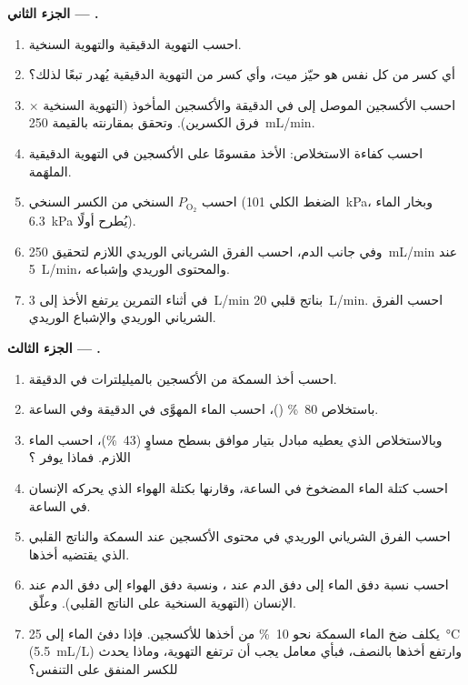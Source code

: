 \begin{problem}
\medskip
\noindent\textbf{الجزء الثاني --- .}
\begin{enumerate}[resume]
  \item احسب التهوية الدقيقية والتهوية السنخية.
  \item أي كسر من كل نفس هو حيّز ميت، وأي كسر من التهوية الدقيقية
        يُهدر تبعًا لذلك؟
  \item احسب الأكسجين الموصل إلى  في الدقيقة والأكسجين
        المأخوذ (التهوية السنخية $\times$ فرق الكسرين). وتحقق
        بمقارنته بالقيمة \qty{250}{mL/min}.
  \item احسب كفاءة الاستخلاص: الأخذ مقسومًا على الأكسجين في
        التهوية الدقيقية الملهَمة.
  \item احسب $P_{\mathrm{O_2}}$ السنخي من الكسر السنخي (الضغط
        الكلي \qty{101}{kPa}، وبخار الماء \qty{6.3}{kPa} يُطرح
        أولًا).
  \item وفي جانب الدم، احسب الفرق الشرياني الوريدي اللازم
        لتحقيق \qty{250}{mL/min} عند \qty{5}{L/min}، والمحتوى الوريدي
        وإشباعه.
  \item في أثناء التمرين يرتفع الأخذ إلى \qty{3}{L/min} بناتج
        قلبي \qty{20}{L/min}. احسب الفرق الشرياني الوريدي والإشباع
        الوريدي.
\end{enumerate}

\medskip
\noindent\textbf{الجزء الثالث --- .}
\begin{enumerate}[resume]
  \item احسب أخذ السمكة من الأكسجين بالميليلترات في الدقيقة.
  \item باستخلاص \qty{80}{\%} ()، احسب الماء المهوَّى في
        الدقيقة وفي الساعة.
  \item وبالاستخلاص الذي يعطيه مبادل بتيار موافق بسطح مساوٍ
        (\qty{43}{\%})، احسب الماء اللازم. فماذا يوفر ؟
  \item احسب كتلة الماء المضخوخ في الساعة، وقارنها بكتلة الهواء
        الذي يحركه الإنسان في الساعة.
  \item احسب الفرق الشرياني الوريدي في محتوى الأكسجين عند السمكة
        والناتج القلبي الذي يقتضيه أخذها.
  \item احسب نسبة دفق الماء إلى دفق الدم عند ، ونسبة دفق
        الهواء إلى دفق الدم عند  الإنسان (التهوية السنخية على
        الناتج القلبي). وعلّق.
  \item يكلف ضخ الماء السمكة نحو \qty{10}{\%} من أخذها للأكسجين.
        فإذا دفئ الماء إلى \qty{25}{\celsius}
        (\qty{5.5}{mL/L}) وارتفع أخذها بالنصف، فبأي معامل يجب أن
        ترتفع التهوية، وماذا يحدث للكسر المنفق على التنفس؟
\end{enumerate}


\end{problem}
